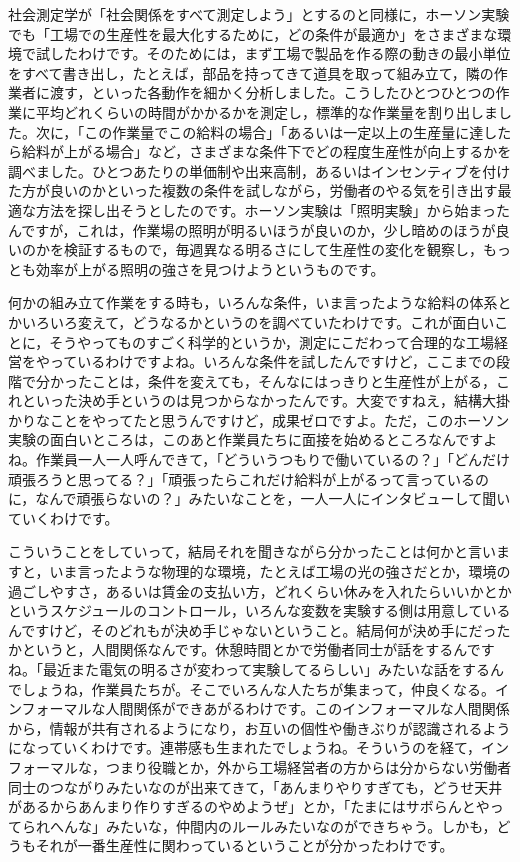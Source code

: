 \documentclass{ltjsbook}
\begin{document}
社会測定学が「社会関係をすべて測定しよう」とするのと同様に，ホーソン実験でも「工場での生産性を最大化するために，どの条件が最適か」をさまざまな環境で試したわけです。そのためには，まず工場で製品を作る際の動きの最小単位をすべて書き出し，たとえば，部品を持ってきて道具を取って組み立て，隣の作業者に渡す，といった各動作を細かく分析しました。こうしたひとつひとつの作業に平均どれくらいの時間がかかるかを測定し，標準的な作業量を割り出しました。次に，「この作業量でこの給料の場合」「あるいは一定以上の生産量に達したら給料が上がる場合」など，さまざまな条件下でどの程度生産性が向上するかを調べました。ひとつあたりの単価制や出来高制，あるいはインセンティブを付けた方が良いのかといった複数の条件を試しながら，労働者のやる気を引き出す最適な方法を探し出そうとしたのです。ホーソン実験は「照明実験」から始まったんですが，これは，作業場の照明が明るいほうが良いのか，少し暗めのほうが良いのかを検証するもので，毎週異なる明るさにして生産性の変化を観察し，もっとも効率が上がる照明の強さを見つけようというものです。

何かの組み立て作業をする時も，いろんな条件，いま言ったような給料の体系とかいろいろ変えて，どうなるかというのを調べていたわけです。これが面白いことに，そうやってものすごく科学的というか，測定にこだわって合理的な工場経営をやっているわけですよね。いろんな条件を試したんですけど，ここまでの段階で分かったことは，条件を変えても，そんなにはっきりと生産性が上がる，これといった決め手というのは見つからなかったんです。大変ですねえ，結構大掛かりなことをやってたと思うんですけど，成果ゼロですよ。ただ，このホーソン実験の面白いところは，このあと作業員たちに面接を始めるところなんですよね。作業員一人一人呼んできて，「どういうつもりで働いているの？」「どんだけ頑張ろうと思ってる？」「頑張ったらこれだけ給料が上がるって言っているのに，なんで頑張らないの？」みたいなことを，一人一人にインタビューして聞いていくわけです。

こういうことをしていって，結局それを聞きながら分かったことは何かと言いますと，いま言ったような物理的な環境，たとえば工場の光の強さだとか，環境の過ごしやすさ，あるいは賃金の支払い方，どれくらい休みを入れたらいいかとかというスケジュールのコントロール，いろんな変数を実験する側は用意しているんですけど，そのどれもが決め手じゃないということ。結局何が決め手にだったかというと，人間関係なんです。休憩時間とかで労働者同士が話をするんですね。「最近また電気の明るさが変わって実験してるらしい」みたいな話をするんでしょうね，作業員たちが。そこでいろんな人たちが集まって，仲良くなる。インフォーマルな人間関係ができあがるわけです。このインフォーマルな人間関係から，情報が共有されるようになり，お互いの個性や働きぶりが認識されるようになっていくわけです。連帯感も生まれたでしょうね。そういうのを経て，インフォーマルな，つまり役職とか，外から工場経営者の方からは分からない労働者同士のつながりみたいなのが出来てきて，「あんまりやりすぎても，どうせ天井があるからあんまり作りすぎるのやめようぜ」とか，「たまにはサボらんとやってられへんな」みたいな，仲間内のルールみたいなのができちゃう。しかも，どうもそれが一番生産性に関わっているということが分かったわけです。
\end{document}
